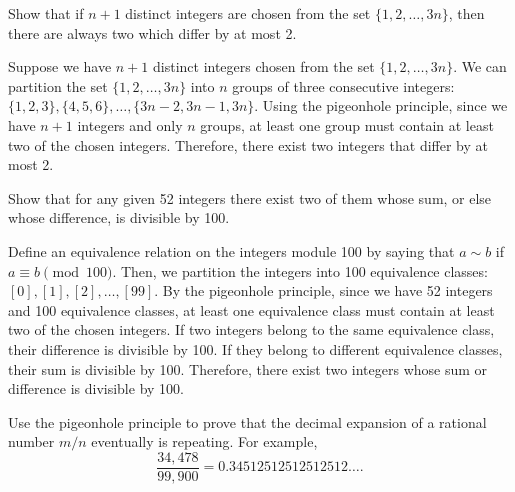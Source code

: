 
\begin{problem}[5]
  Show that if $n + 1$ distinct integers are chosen from the set $\{1, 2, \ldots , 3n\}$, then there are always two which differ by at most 2.
\end{problem}

\begin{solution}
  Suppose we have $n + 1$ distinct integers chosen from the set $\{1, 2, \ldots, 3n\}$. We can partition the set $\{1, 2, \ldots, 3n\}$ into $n$ groups of three consecutive integers: $\{1, 2, 3\}, \{4, 5, 6\}, \ldots, \{3n - 2, 3n - 1, 3n\}$. Using the pigeonhole principle, since we have $n + 1$ integers and only $n$ groups, at least one group must contain at least two of the chosen integers. Therefore, there exist two integers that differ by at most 2.
\end{solution}

\begin{problem}[7]
  Show that for any given 52 integers there exist two of them whose sum, or else whose difference, is divisible by 100.
\end{problem}

\begin{solution}
  Define an equivalence relation on the integers module 100 by saying that $a \sim b$ if $a \equiv b \pmod{100}$. Then, we partition the integers into 100 equivalence classes: $[0], [1], [2], \ldots, [99]$. By the pigeonhole principle, since we have 52 integers and 100 equivalence classes, at least one equivalence class must contain at least two of the chosen integers. If two integers belong to the same equivalence class, their difference is divisible by 100. If they belong to different equivalence classes, their sum is divisible by 100. Therefore, there exist two integers whose sum or difference is divisible by 100.
\end{solution}

\begin{problem}[8]
  Use the pigeonhole principle to prove that the decimal expansion of a rational number $m/n$ eventually is repeating. For example,
  \[%
    \frac{34,478}{99,900} = 0.34512512512512512\dots
  .\]%
\end{problem}


